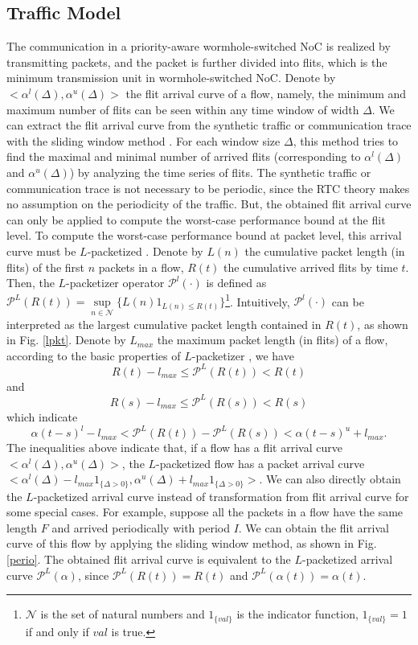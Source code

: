 \documentclass[10pt,journal]{IEEEtran}
\begin{document}
\subsection{Traffic Model}\label{traffic}
The communication in a priority-aware wormhole-switched NoC is realized by transmitting packets, and the packet is further divided into flits, which is the minimum transmission unit in wormhole-switched NoC. Denote by $<\alpha^l(\Delta),\alpha^u(\Delta)>$ the flit arrival curve of a flow, namely, the minimum and maximum number of flits can be seen within any time window of width $\Delta$. We can extract the flit arrival curve from the synthetic traffic or communication trace with the sliding window method \cite{1253607}. For each window size $\Delta$, this method tries to find the maximal and minimal number of arrived flits (corresponding to $\alpha^l(\Delta)$ and $\alpha^u(\Delta)$) by analyzing the time series of flits. The synthetic traffic or communication trace is not necessary to be periodic, since the RTC theory makes no assumption on the periodicity of the traffic. But, the obtained flit arrival curve can only be applied to compute the worst-case performance bound at the flit level. To compute the worst-case performance bound at packet level, this arrival curve must be $L$-packetized \cite{Boudec2001Network}. Denote by $L(n)$ the cumulative packet length (in flits) of the first $n$ packets in a flow, $R(t)$ the cumulative arrived flits by time $t$. Then, the $L$-packetizer operator $\mathcal{P}^l(\cdot)$ is defined as $\mathcal{P}^L(R(t))=\underset{n\in\mathcal{N}}{\sup}\{L(n)1_{L(n)\leq R(t)}\}$\footnote{$\mathcal{N}$ is the set of natural numbers and $1_{\{val\}}$ is the indicator function, $1_{\{val\}}=1$ if and only if $val$ is true.}. Intuitively, $\mathcal{P}^l(\cdot)$ can be interpreted as the largest cumulative packet length contained in $R(t)$, as shown in Fig. \ref{lpkt}. Denote by $L_{max}$ the maximum packet length (in flits) of a flow, according to the basic properties of $L$-packetizer \cite{Boudec2001Network}, we have
$$R(t)-l_{max}\leq \mathcal{P}^L(R(t))<R(t)$$
and
$$R(s)-l_{max}\leq \mathcal{P}^L(R(s))<R(s)$$
which indicate
$$\alpha(t-s)^l-l_{max}<\mathcal{P}^L(R(t))-\mathcal{P}^L(R(s))<\alpha(t-s)^u+l_{max}.$$
The inequalities above indicate that, if a flow has a flit arrival curve $<\alpha^l(\Delta),\alpha^u(\Delta)>$, the $L$-packetized flow has a packet arrival curve $<\alpha^l(\Delta)-l_{max}1_{\{\Delta>0\}},\alpha^u(\Delta)+l_{max}1_{\{\Delta>0\}}>$. We can also directly obtain the $L$-packetized arrival curve instead of transformation from flit arrival curve for some special cases. For example, suppose all the packets in a flow have the same length $F$ and arrived periodically with period $I$. We can obtain the flit arrival curve of this flow by applying the sliding window method, as shown in Fig. \ref{perio}. The obtained flit arrival curve is equivalent to the $L$-packetized arrival curve $\mathcal{P}^L(\alpha)$, since $\mathcal{P}^L(R(t))=R(t)$ and $\mathcal{P}^L(\alpha(t))=\alpha(t)$.
\end{document}
